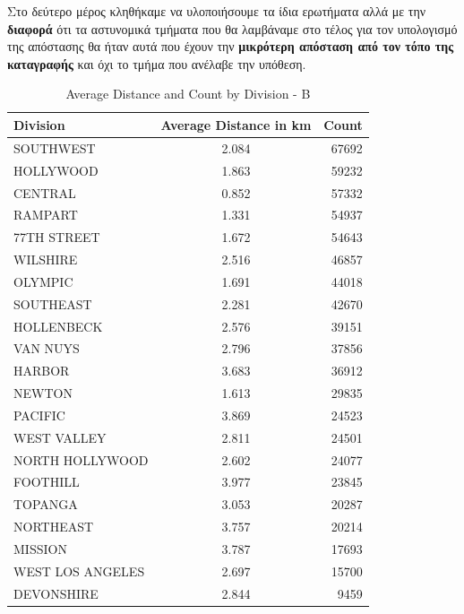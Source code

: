 \documentclass{article}
\begin{document}
\clearpage
{}
Στο δεύτερο μέρος κληθήκαμε να υλοποιήσουμε τα ίδια ερωτήματα αλλά με την \textbf{διαφορά} ότι τα αστυνομικά τμήματα που θα λαμβάναμε στο τέλος για τον υπολογισμό της απόστασης θα ήταν αυτά που έχουν την \textbf{μικρότερη απόσταση από τον τόπο της καταγραφής} και όχι το τμήμα που ανέλαβε την υπόθεση.

\begin{table}[ht]
\centering
\begin{tabular}{|l|c|r|}
\hline
Division        & Average Distance in km & Count \\ \hline
SOUTHWEST       & 2.084 & 67692 \\ \hline
HOLLYWOOD       & 1.863 & 59232 \\ \hline
CENTRAL         & 0.852 & 57332 \\ \hline
RAMPART         & 1.331 & 54937 \\ \hline
77TH STREET     & 1.672 & 54643 \\ \hline
WILSHIRE        & 2.516 & 46857 \\ \hline
OLYMPIC         & 1.691 & 44018 \\ \hline
SOUTHEAST       & 2.281 & 42670 \\ \hline
HOLLENBECK      & 2.576 & 39151 \\ \hline
VAN NUYS        & 2.796 & 37856 \\ \hline
HARBOR          & 3.683 & 36912 \\ \hline
NEWTON          & 1.613 & 29835 \\ \hline
PACIFIC         & 3.869 & 24523 \\ \hline
WEST VALLEY     & 2.811 & 24501 \\ \hline
NORTH HOLLYWOOD & 2.602 & 24077 \\ \hline
FOOTHILL        & 3.977 & 23845 \\ \hline
TOPANGA         & 3.053 & 20287 \\ \hline
NORTHEAST       & 3.757 & 20214 \\ \hline
MISSION         & 3.787 & 17693 \\ \hline
WEST LOS ANGELES& 2.697 & 15700 \\ \hline
DEVONSHIRE      & 2.844 & 9459  \\ \hline
\end{tabular}
\caption{Average Distance and Count by Division - B}
\label{table:division_distance_count_b}
\end{table}
\end{document}
